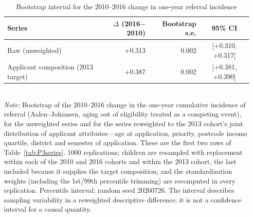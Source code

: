 \begin{table}[htbp]\centering
\caption{Bootstrap interval for the 2010--2016 change in one-year referral incidence}
\label{tab:P3boot}
\footnotesize
\setlength{\tabcolsep}{6pt}
\begin{tabular}{lrrc}
\toprule
Series & $\Delta$ (2016$-$2010) & Bootstrap s.e. & 95\% CI \\
\midrule
Raw (unweighted) & +0.313 & 0.002 & [+0.310, +0.317] \\
Applicant composition (2013 target) & +0.387 & 0.002 & [+0.381, +0.390] \\
\bottomrule
\end{tabular}
\\[3pt]{\footnotesize \textit{Note:} Bootstrap of the 2010--2016 change in the one-year cumulative incidence of referral (Aalen--Johansen, aging out of eligibility treated as a competing event), for the unweighted series and for the series reweighted to the 2013 cohort's joint distribution of applicant attributes---age at application, priority, postcode income quartile, district and semester of application. These are the first two rows of Table~\ref{tab:P3series}. 1000 replications; children are resampled with replacement within each of the 2010 and 2016 cohorts and within the 2013 cohort, the last included because it supplies the target composition, and the standardization weights (including the 1st/99th percentile trimming) are recomputed in every replication. Percentile interval; random seed 20260726. The interval describes sampling variability in a reweighted descriptive difference; it is not a confidence interval for a causal quantity.}
\end{table}
